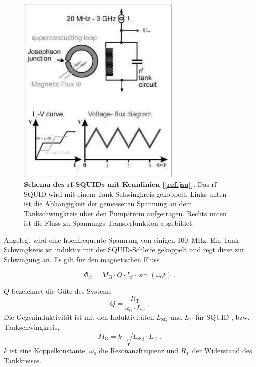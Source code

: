 \documentclass[a4paper,ngerman]{scrartcl}
\begin{document}
\begin{figure}[tb!]
\centering
\includegraphics[width=0.7\textwidth]{abbildungen/squid_rf.png}
\caption[Versuchsplatz]{\textbf{Schema des rf-SQUIDs mit Kennlinien [\ref{ref:jsq}].} Das rf-SQUID wird mit einem Tank-Schwingkreis gekoppelt. Links unten ist die Abhängigkeit der gemessenen Spannung an dem Tankschwingkreis über den Pumpstrom aufgetragen. Rechts unten ist die Fluss zu Spannungs-Transferfunktion abgebildet.}
\label{fig:jsq}
\end{figure}



Angelegt wird eine hochfrequente Spannung von einigen \SI{100}{MHz}. 
Ein Tank-Schwingkreis ist induktiv mit der SQUID-Schleife gekoppelt und regt diese zur Schwingung an.
Es gilt für den magnetischen Fluss 

\begin{equation}
\Phi_{\mathrm{rf}} = M_\mathrm{G} \cdot Q \cdot I_{\mathrm{rf}} \cdot \sin(\omega_\mathrm{0} t) ~.
\end{equation}

$Q$ bezeichnet die Güte des Systems
\begin{equation}
Q = \frac{R_\mathrm{T}}{\omega_\mathrm{0} \cdot L_\mathrm{T}} ~.
\end{equation}
Die Gegeninduktivität ist mit den Induktivitäten $L_{\mathrm{SQ}}$ und $L_{\mathrm{T}}$ für SQUID-, bzw. Tankschwingkreis,
\begin{equation}
M_\mathrm{G} = k \cdot \sqrt{L_{\mathrm{SQ}} \cdot L_\mathrm{T}} ~.
\end{equation}
$k$ ist eine Koppelkonstante, $\omega_\mathrm{0}$ die Resonanzfrequenz und $R_\mathrm{T}$ der Widerstand des Tankkreises.
\end{document}

